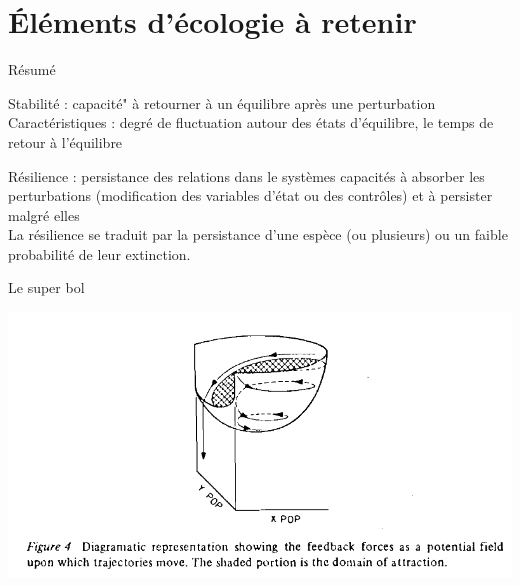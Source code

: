 \documentclass[11,aspectratio=1610]{beamer}
\begin{document}
\section{Éléments d'écologie à retenir }


\begin{frame}{Résumé}



\alert{Stabilité} : capacité" à retourner à un équilibre après une perturbation\\
Caractéristiques  : degré de fluctuation  autour des états d'équilibre, le temps de retour à l'équilibre

\vfill

\alert{Résilience} : persistance des relations dans le systèmes capacités à absorber les perturbations (modification des variables d'état ou des contrôles) et à persister malgré elles \\
 La résilience se traduit par la persistance d'une espèce (ou plusieurs) ou un faible probabilité de leur extinction.


\end{frame}



\begin{frame}{Le super bol}



\includegraphics[height=0.8\textheight]{img/bowl.png}

\end{frame}
\end{document}
